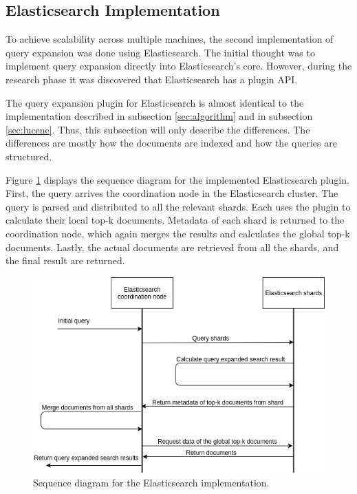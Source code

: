 \subsection{Elasticsearch Implementation}
To achieve scalability across multiple machines,
the second implementation of query expansion was done using Elasticsearch.
The initial thought was to implement query expansion directly into Elasticsearch's core.
However, during the research phase it was discovered that Elasticsearch has a plugin API.

The query expansion plugin for Elasticsearch is almost identical to the implementation described in subsection \ref{sec:algorithm} and in subsection \ref{sec:lucene}.
Thus, this subsection will only describe the differences.
The differences are mostly how the documents are indexed and how the queries are structured.

Figure \ref{fig:sequence-diagram-elasticsearch} displays the sequence diagram for the implemented Elasticsearch plugin.
First, the query arrives the coordination node in the Elasticsearch cluster.
The query is parsed and distributed to all the relevant shards.
Each uses the plugin to calculate their local top-k documents.
Metadata of each shard is returned to the coordination node,
which again merges the results and calculates the global top-k documents.
Lastly,
the actual documents are retrieved from all the shards,
and the final result are returned.

\begin{figure}[h!]
  \centering \includegraphics[width=1\linewidth]{img/sequence-diagram-elasticsearch.png}
  \caption{Sequence diagram for the Elasticsearch implementation.}
  \label{fig:sequence-diagram-elasticsearch}
\end{figure}

